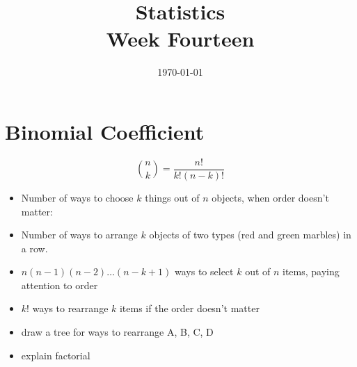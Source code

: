 \documentclass[landscape]{exam}
\title{Statistics \\ Week Fourteen}
\date{\today}
\author{}
\begin{document}
  \maketitle
  \tableofcontents

  \section{Binomial Coefficient}

  \[
    \binom{n}{k} = \frac{n!}{k! (n - k)!}
  \]

  \begin{itemize}

    \item Number of ways to choose $k$ things out of $n$ objects, when order
      doesn't matter:

    \item Number of ways to arrange $k$ objects of two types (red and green
      marbles) in a row.

  \end{itemize}

  \begin{itemize}
    \item $n (n - 1)(n - 2) \dots (n - k + 1)$ ways to select $k$ out of
      $n$ items, paying attention to order

    \item $k!$ ways to rearrange $k$ items if the order doesn't matter

    \item draw a tree for ways to rearrange A, B, C, D

    \item explain factorial
  \end{itemize}
\end{document}
